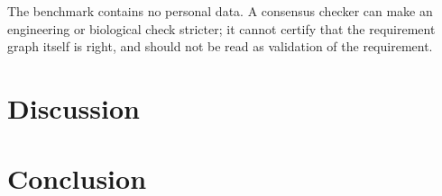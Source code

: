 The benchmark contains no personal data. A consensus checker can make an engineering or biological check stricter; it cannot certify that the requirement graph itself is right, and \Sat{} should not be read as validation of the requirement.

\section{Discussion}


\section{Conclusion}

